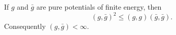 If $g$ and $\bar{g}$ are pure potentials of finite energy, then
$$(g, \bar{g})^2 \leq (g, g)(\bar{g}, \bar{g}).$$
Consequently $(g, \bar{g}) < \infty$.
